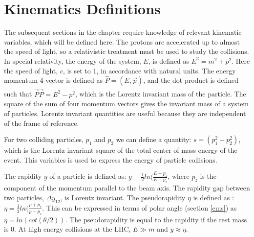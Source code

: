 \documentclass[oneside, letterpaper, oldfontcommands]{memoir}
\begin{document}
\section{Kinematics Definitions}\label{kindef}
\qquad The subsequent sections in the chapter require knowledge of relevant kinematic variables, which will be defined here. The protons are accelerated up to almost the speed of light, so a relativistic treatment must be used to study the collisions.   In special relativity, the energy of the system, $E$, is defined as $E^{2} = m^{2}+p^{2}$. Here the speed of light, $c$, is set to 1, in accordance with natural units. The energy momentum 4-vector is defined as $ \hat{P} = (E, \vec{p})$, and the dot product is defined such that $\vec{P} \dot \vec{P} = E^{2}-p^{2}$, which is the Lorentz invariant mass of the particle. The square of the sum of four momentum vectors gives the invariant mass of a system of particles. Lorentz invariant quantities are useful because they are independent of the frame of reference. 

\qquad For two colliding particles, $p_{1}$ and $p_{2}$ we can define a quantity: $s = (p_{1}^2+p_{2}^2)$, which is the Lorentz invariant square of the total center of mass energy of the event. This variables is used to express the energy of particle collisions.

\qquad The rapidity $y$ of a particle is defined as: $y = \frac{1}{2}ln(\frac{E+p_{z}}{E-p_{z}}$, where $p_{z}$ is the component of the momentum parallel to the beam axis. The rapidity gap between two particles, $\Delta y_{12}$, is Lorentz invariant. The pseudorapidity $\eta$ is defined as : $\eta = \frac{1}{2}ln(\frac{p+p_{z}}{p-p_{z}}$. This can be expressed in terms of polar angle (section \ref{cms}) as $\eta = ln(cot(\theta /2))$. The pseudorapidity is equal to the rapidity if the rest mass is 0. At high energy collisions at the LHC, $E \gg m$ and $y \approx \eta$.
\end{document}
